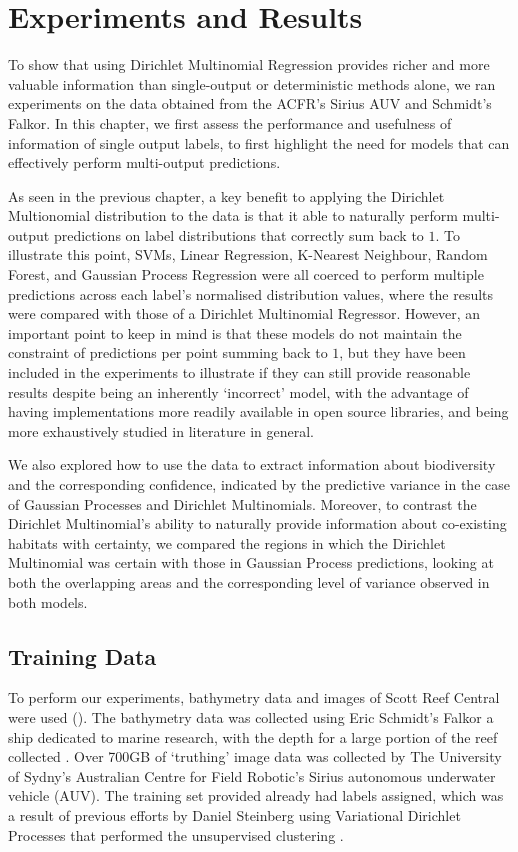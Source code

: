 \chapter{Experiments and Results} \label{chap:experiments}

To show that using Dirichlet Multinomial Regression provides richer and more valuable information than single-output or deterministic methods alone, we ran experiments on the data obtained from the ACFR's Sirius AUV and Schmidt's Falkor. In this chapter, we first assess the performance and usefulness of information of single output labels, to first highlight the need for models that can effectively perform multi-output predictions.

As seen in the previous chapter, a key benefit to applying the Dirichlet Multionomial distribution to the data is that it able to naturally perform multi-output predictions on label distributions that correctly sum back to $1$. To illustrate this point, SVMs, Linear Regression, K-Nearest Neighbour, Random Forest, and Gaussian Process Regression were all coerced to perform multiple predictions across each label's normalised distribution values, where the results were compared with those of a Dirichlet Multinomial Regressor. However, an important point to keep in mind is that these models do not maintain the constraint of predictions per point summing back to $1$, but they have been included in the experiments to illustrate if they can still provide reasonable results despite being an inherently `incorrect' model, with the advantage of having implementations more readily available in open source libraries, and being more exhaustively studied in literature in general.

We also explored how to use the data to extract information about biodiversity and the corresponding confidence, indicated by the predictive variance in the case of Gaussian Processes and Dirichlet Multinomials. Moreover, to contrast the Dirichlet Multinomial's ability to naturally provide information about co-existing habitats with certainty, we compared the regions in which the Dirichlet Multinomial was certain with those in Gaussian Process predictions, looking at both the overlapping areas and the corresponding level of variance observed in both models.

\section{Training Data}
To perform our experiments, bathymetry data and images of Scott Reef Central were used (). The bathymetry data was collected using Eric Schmidt's Falkor a ship dedicated to marine research, with the depth for a large portion of the reef collected . Over 700GB of `truthing' image data was collected by The University of Sydny's Australian Centre for Field Robotic's Sirius autonomous underwater vehicle (AUV). The training set provided already had labels assigned, which was a result of previous efforts by Daniel Steinberg using Variational Dirichlet Processes that performed the unsupervised clustering \citep{steinberg11}. 

